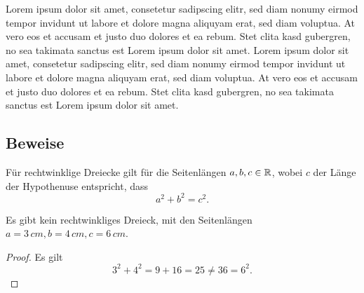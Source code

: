 
Lorem ipsum dolor sit amet, consetetur sadipscing elitr, sed diam nonumy eirmod tempor invidunt ut labore et dolore magna aliquyam erat, sed diam voluptua. At vero eos et accusam et justo duo dolores et ea rebum. Stet clita kasd gubergren, no sea takimata sanctus est Lorem ipsum dolor sit amet. Lorem ipsum dolor sit amet, consetetur sadipscing elitr, sed diam nonumy eirmod tempor invidunt ut labore et dolore magna aliquyam erat, sed diam voluptua. At vero eos et accusam et justo duo dolores et ea rebum. Stet clita kasd gubergren, no sea takimata sanctus est Lorem ipsum dolor sit amet.

\subsection{Beweise}

\begin{theorem}
  Für rechtwinklige Dreiecke gilt für die Seitenlängen $a, b, c\in\mathbb{R}$, wobei $c$ der Länge der
  Hypothenuse entspricht, dass
  \begin{equation*}
    a^{2} + b^{2} = c^{2}.
  \end{equation*}
\end{theorem}
\begin{corollary}
  Es gibt kein rechtwinkliges Dreieck, mit den Seitenlängen $a=3\,cm, b=4\,cm, c=6\,cm$.
\end{corollary}
\begin{proof}
  Es gilt
  \begin{equation*}
    3^{2} + 4^{2} = 9 + 16 = 25 \neq 36 = 6^{2}.
  \end{equation*}
\end{proof}
